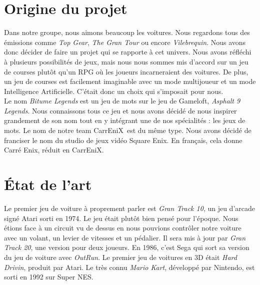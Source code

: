 \documentclass[12pt,a4paper]{article}
\newcommand{\CEX}{CarrEniX}
\begin{document}
\section{Origine du projet}
Dans notre groupe, nous aimons beaucoup les voitures. Nous regardons tous des émissions comme 
\textit{Top Gear}, \textit{The Gran Tour} ou encore \textit{Vilebrequin}. Nous avons donc décider de faire
un projet qui se rapporte à cet univers. Nous avons réfléchi à plusieurs possibilités de jeux, mais nous
nous sommes mis d'accord sur un jeu de courses plutôt qu'un RPG où les joueurs incarneraient des voitures.
De plus, un jeu de courses est facilement imaginable avec un mode multijoueur et un mode Intelligence 
Artificielle. C'était donc un choix qui s'imposait pour nous.\\

\indent Le nom \textit{Bitume Legends} est un jeu de mots sur le jeu de Gameloft, \textit{Asphalt 9 Legends}.
Nous connaissons tous ce jeu et nous avons décidé de nous inspirer grandement de son nom tout en y intégrant
une de nos spécialités : les jeux de mots. Le nom de notre team \CEX\, est du même type. Nous avons décidé
de franciser le nom du studio de jeux vidéo Square Enix. En français, cela donne Carré Enix, réduit en
\CEX.\\

\section{État de l'art}
Le premier jeu de voiture à proprement parler est \textit{Gran Track 10}, un jeu d'arcade signé Atari 
sorti en 1974. Le jeu était plutôt bien pensé pour l'époque. Nous étions face à un 
circuit vu de dessus en nous pouvions contrôler notre voiture avec un volant, un levier de vitesses
et un pédalier. Il sera mis à jour par \textit{Gran Track 20}, une version pour deux joueurs.
En 1986, c'est Sega qui sort sa version du jeu de voiture avec \textit{OutRun}. Le premier 
jeu de voitures en 3D était \textit{Hard Drivin}, produit par Atari. Le très connu \textit{Mario Kart},
développé par Nintendo, est sorti en 1992 sur Super NES.\\
\end{document}
